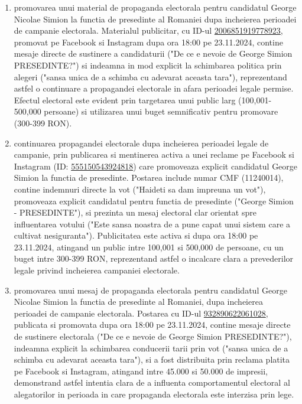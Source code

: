\documentclass[a4paper,12pt]{article}
\begin{document}
\begin{enumerate}[leftmargin=*, label=\arabic*.)]
    \item promovarea unui material de propaganda electorala pentru candidatul George Nicolae Simion la functia de presedinte al Romaniei dupa incheierea perioadei de campanie electorala. Materialul publicitar, cu ID-ul \href{https://www.facebook.com/ads/library/?id=2006851919778923}{2006851919778923}, promovat pe Facebook si Instagram dupa ora 18:00 pe 23.11.2024, contine mesaje directe de sustinere a candidaturii ("De ce e nevoie de George Simion PRESEDINTE?") si indeamna in mod explicit la schimbarea politica prin alegeri ("sansa unica de a schimba cu adevarat aceasta tara"), reprezentand astfel o continuare a propagandei electorale in afara perioadei legale permise. Efectul electoral este evident prin targetarea unui public larg (100,001-500,000 persoane) si utilizarea unui buget semnificativ pentru promovare (300-399 RON).
    \item continuarea propagandei electorale dupa incheierea perioadei legale de campanie, prin publicarea si mentinerea activa a unei reclame pe Facebook si Instagram (ID: \href{https://www.facebook.com/ads/library/?id=555150543924818}{555150543924818}) care promoveaza explicit candidatul George Simion la functia de presedinte. Postarea include numar CMF (11240014), contine indemnuri directe la vot ("Haideti sa dam impreuna un vot"), promoveaza explicit candidatul pentru functia de presedinte ("George Simion - PRESEDINTE"), si prezinta un mesaj electoral clar orientat spre influentarea votului ("Este sansa noastra de a pune capat unui sistem care a cultivat nesiguranta"). Publicitatea este activa si dupa ora 18:00 pe 23.11.2024, atingand un public intre 100,001 si 500,000 de persoane, cu un buget intre 300-399 RON, reprezentand astfel o incalcare clara a prevederilor legale privind incheierea campaniei electorale.
    \item promovarea unui mesaj de propaganda electorala pentru candidatul George Nicolae Simion la functia de presedinte al Romaniei, dupa incheierea perioadei de campanie electorala. Postarea cu ID-ul \href{https://www.facebook.com/ads/library/?id=932890622061028}{932890622061028}, publicata si promovata dupa ora 18:00 pe 23.11.2024, contine mesaje directe de sustinere electorala ("De ce e nevoie de George Simion PRESEDINTE?"), indeamna explicit la schimbarea conducerii tarii prin vot ("sansa unica de a schimba cu adevarat aceasta tara"), si a fost distribuita prin reclama platita pe Facebook si Instagram, atingand intre 45.000 si 50.000 de impresii, demonstrand astfel intentia clara de a influenta comportamentul electoral al alegatorilor in perioada in care propaganda electorala este interzisa prin lege.

\end{enumerate}
\end{document}
